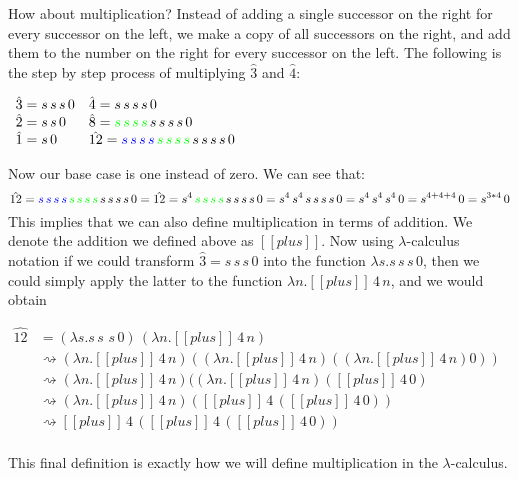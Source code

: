 \documentclass{article}
\newcommand {\redto}[0]{\rightsquigarrow}
\begin{document}
How about multiplication? Instead of adding a single successor on the
right for every successor on the left, we make a copy of all
successors on the right, and add them to the number on the right for
every successor on the left.  The following is the step by step
process of multiplying $\hat{3}$ and $\hat{4}$:
\begin{center}
  \begin{math}
    \begin{array}{lll}
      \hat{3} = s\,s\,s\,0 & \hat{4} = s\,s\,s\,s\,0\\
      \hat{2} = s\,s\,0    & \hat{8} = {\color{green}{s\,s\,s\,s}}\,s\,s\,s\,s\,0\\
      \hat{1} = s\,0       & \hat{12} = {\color{blue}{s\,s\,s\,s}}\,{\color{green}{s\,s\,s\,s}}\,s\,s\,s\,s\,0\\
    \end{array}
  \end{math}
\end{center}
Now our base case is one instead of zero.  We can see that:
\[\hat{12} = {\color{blue}{s\,s\,s\,s}}\,{\color{green}{s\,s\,s\,s}}\,s\,s\,s\,s\,0 = \hat{12} = s^4\,{\color{green}{s\,s\,s\,s}}\,s\,s\,s\,s\,0 =  s^4\,s^4\,s\,s\,s\,s\,0 = s^4\,s^4\,s^4\,0 = s^{4+4+4}\,0 = s^{3*4}\,0 \]
This implies that we can also define multiplication in terms of
addition.  We denote the addition we defined above as $[[plus]]$.  Now
using $\lambda$-calculus notation if we could transform $\hat{3} =
s\,s\,s\,0$ into the function $\lambda s.s\,s\,s\,0$, then we could
simply apply the latter to the function $\lambda n.[[plus]]\,4\,n$,
and we would obtain
\begin{center}
  \begin{math}
    \begin{array}{lll}
      \hat{12} 
      & = (\lambda s.s\,s\,\,s\,0)\,(\lambda n.[[plus]]\,4\,n) \\
      & \redto (\lambda n.[[plus]]\,4\,n) ((\lambda n.[[plus]]\,4\,n) ((\lambda n.[[plus]]\,4\,n) 0))\\
      & \redto (\lambda n.[[plus]]\,4\,n) ((\lambda n.[[plus]]\,4\,n) ([[plus]]\,4\,0)\\ 
      & \redto (\lambda n.[[plus]]\,4\,n) ([[plus]]\,4\,([[plus]]\,4\,0)) \\ 
      & \redto [[plus]]\,4\,([[plus]]\,4\,([[plus]]\,4\,0)) \\ 
    \end{array}
  \end{math}
\end{center}
This final definition is exactly how we will define multiplication in
the $\lambda$-calculus.
\end{document}
